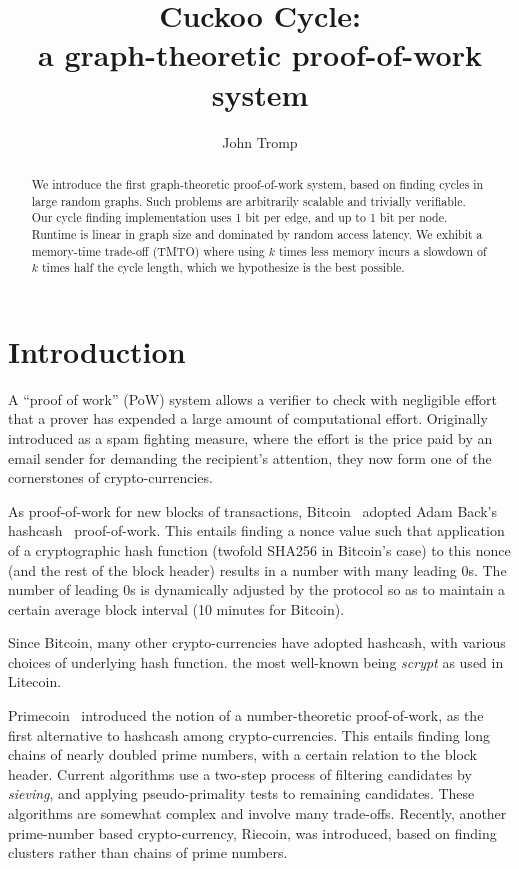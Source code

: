 \documentclass[11pt, oneside]{article}
\title{Cuckoo Cycle: \protect\\ a graph-theoretic proof-of-work system}
\author{John Tromp}
\begin{document}
\maketitle

\begin{abstract}
We introduce the first graph-theoretic proof-of-work system,
based on finding cycles in large random graphs.
Such problems are arbitrarily scalable and trivially verifiable.
Our cycle finding implementation uses 1 bit per edge, and up to 1 bit per node.
Runtime is linear in graph size and dominated by random access latency.
We exhibit a memory-time trade-off (TMTO) where using $k$ times less memory
incurs a slowdown of $k$ times half the cycle length, which we hypothesize
is the best possible.
\end{abstract}

\section{Introduction}
A ``proof of work'' (PoW) system allows a verifier to check with negligible
effort that a prover has expended a large amount of computational effort.
Originally introduced as a spam fighting measure, 
where the effort is the price paid by an email sender for demanding the
recipient's attention, they now form one of the cornerstones of
crypto-currencies.

As proof-of-work for new blocks of transactions,
Bitcoin~\cite{nakamoto2009bitcoin} adopted Adam Back's hashcash~\cite{back2002} proof-of-work.
This entails finding a nonce value such that
application of a cryptographic hash function (twofold SHA256 in Bitcoin's case)
to this nonce (and the rest of the block header) results in a number with
many leading 0s. The number of leading 0s is dynamically adjusted by the protocol
so as to maintain a certain average block interval (10 minutes for Bitcoin).

Since Bitcoin, many other crypto-currencies have adopted hashcash, with various
choices of underlying hash function. the most well-known being {\em scrypt} as
used in Litecoin.

Primecoin~\cite{king2013} introduced the notion of a number-theoretic proof-of-work,
as the first alternative to hashcash among crypto-currencies.
This entails finding long chains of nearly doubled prime numbers, with a certain
relation to the block header.
Current algorithms use a two-step process of filtering candidates by {\em sieving},
and applying pseudo-primality tests to remaining candidates.
These algorithms are somewhat complex and involve many trade-offs.
Recently, another prime-number based crypto-currency, Riecoin, was introduced, based
on finding clusters rather than chains of prime numbers.
\end{document}
